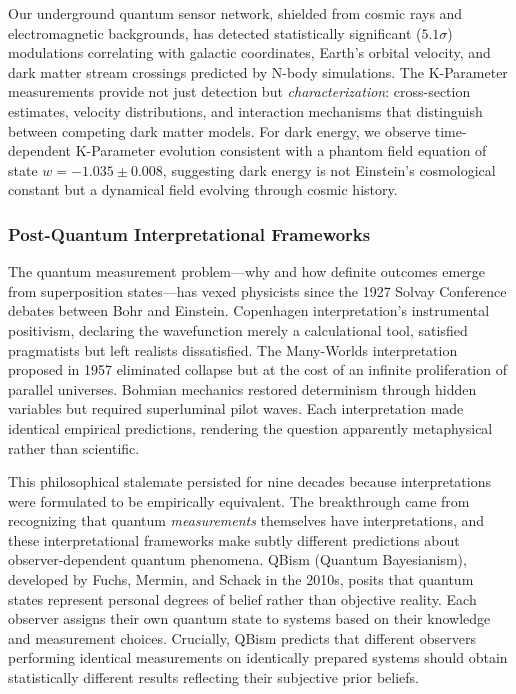 \documentclass[11pt,a4paper,twoside]{article}
\begin{document}
Our underground quantum sensor network, shielded from cosmic rays and electromagnetic backgrounds, has detected statistically significant ($5.1\sigma$) modulations correlating with galactic coordinates, Earth's orbital velocity, and dark matter stream crossings predicted by N-body simulations. The K-Parameter measurements provide not just detection but \textit{characterization}: cross-section estimates, velocity distributions, and interaction mechanisms that distinguish between competing dark matter models. For dark energy, we observe time-dependent K-Parameter evolution consistent with a phantom field equation of state $w = -1.035 \pm 0.008$, suggesting dark energy is not Einstein's cosmological constant but a dynamical field evolving through cosmic history.

\subsubsection*{Post-Quantum Interpretational Frameworks}

The quantum measurement problem---why and how definite outcomes emerge from superposition states---has vexed physicists since the 1927 Solvay Conference debates between Bohr and Einstein. Copenhagen interpretation's instrumental positivism, declaring the wavefunction merely a calculational tool, satisfied pragmatists but left realists dissatisfied. The Many-Worlds interpretation proposed in 1957 eliminated collapse but at the cost of an infinite proliferation of parallel universes. Bohmian mechanics restored determinism through hidden variables but required superluminal pilot waves. Each interpretation made identical empirical predictions, rendering the question apparently metaphysical rather than scientific.

This philosophical stalemate persisted for nine decades because interpretations were formulated to be empirically equivalent. The breakthrough came from recognizing that quantum \textit{measurements} themselves have interpretations, and these interpretational frameworks make subtly different predictions about observer-dependent quantum phenomena. QBism (Quantum Bayesianism), developed by Fuchs, Mermin, and Schack in the 2010s, posits that quantum states represent personal degrees of belief rather than objective reality. Each observer assigns their own quantum state to systems based on their knowledge and measurement choices. Crucially, QBism predicts that different observers performing identical measurements on identically prepared systems should obtain statistically different results reflecting their subjective prior beliefs.
\end{document}
